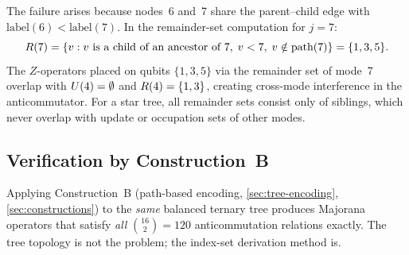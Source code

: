 The failure arises because nodes~6 and~7 share the parent--child
edge with $\text{label}(6) < \text{label}(7)$.  In the remainder-set
computation for $j = 7$:
\[
  R(7) = \{v : v \text{ is a child of an ancestor of } 7,\;
    v < 7,\; v \notin \text{path}(7)\} = \{1, 3, 5\}.
\]
The $Z$-operators placed on qubits $\{1, 3, 5\}$ via the remainder
set of mode~7 overlap with $U(4) = \emptyset$ and $R(4) =
\{1, 3\}$, creating cross-mode interference in the anticommutator.
For a star tree, all remainder sets consist only of siblings, which
never overlap with update or occupation sets of other modes.

\subsection*{Verification by Construction~B}

Applying Construction~B (path-based encoding,
\cref{sec:tree-encoding}, \cref{sec:constructions}) to the \emph{same} balanced ternary tree
produces Majorana operators that satisfy \emph{all} $\binom{16}{2} =
120$ anticommutation relations exactly.  The tree topology is not the
problem; the index-set derivation method is.
